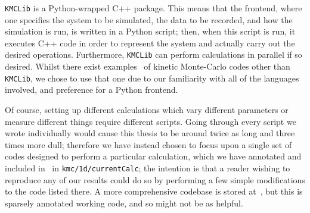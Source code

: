 \texttt{KMCLib} is a Python-wrapped C++ package. This means that the frontend, where one specifies the
system to be simulated, the data to be recorded, and how the simulation is run, is written in a Python
script; then, when this script is run, it executes C++ code in order to represent the system and
actually carry out the desired operations. Furthermore, \texttt{KMCLib} can perform calculations in
parallel if so desired. Whilst there exist examples~\cite{hoffmann2014kmos, spparks} of kinetic
Monte-Carlo codes other than \texttt{KMCLib}, we chose to use that one due to our familiarity with all
of the languages involved, and preference for a Python frontend.

Of course, setting up different calculations which vary different parameters or measure different things
require different scripts. Going through every script we wrote individually would cause this thesis
to be around twice as long and three times more dull; therefore we have instead chosen to focus
upon a single set of codes designed to perform a particular calculation, which we have annotated and 
included in~\cite{hellier2019a} in \texttt{kmc/1d/currentCalc}; the intention is that a reader wishing to reproduce any of our results could do
so by performing a few simple modifications to the code listed there. A more comprehensive codebase is
stored at~\cite{hellier2019b}, but this is sparsely annotated working code, and so might not be as helpful.

